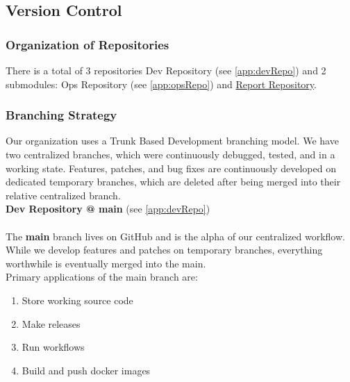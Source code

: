 \subsection{Version Control}
\label{subsec:vs}
\subsubsection{Organization of Repositories}
There is a total of 3 repositories Dev Repository (see \ref{app:devRepo}) and 2 submodules: Ops Repository (see \ref{app:opsRepo}) and \href{https://github.com/Akongstad/DevOps-Report}{Report Repository}.

\subsubsection{Branching Strategy}


Our organization uses a Trunk Based Development branching model. We have two centralized branches, which were continuously debugged, tested, and in a working state. Features, patches, and bug fixes are continuously developed on dedicated temporary branches, which are deleted after being merged into their relative centralized branch.\\

\textbf{Dev Repository @ main} (see \ref{app:devRepo})\\\\
The \textbf{main} branch lives on GitHub and is the alpha of our centralized workflow. While we develop features and patches on temporary branches, everything worthwhile is eventually merged into the main. \\

Primary applications of the main branch are:
\begin{enumerate}
    \item Store working source code
    \item Make releases
    \item Run workflows
    \item Build and push docker images\\
\end{enumerate}

